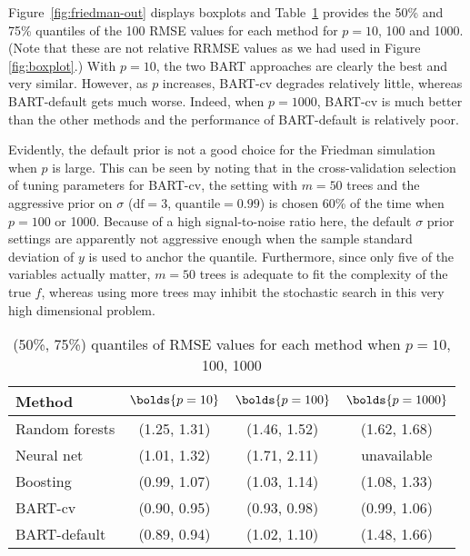 \documentclass[aoas,nameyear,dvips]{arximspdf}
\begin{document}
Figure~\ref{fig:friedman-out} displays boxplots and
Table~\ref{tab:friedman-perf} provides the 50\% and 75\% quantiles of
the 100 RMSE values for each method for $p = 10$, 100 and 1000.  (Note
that these are not relative RRMSE values as we had used in Figure
\ref{fig:boxplot}.)  With $p = 10$, the two BART approaches are clearly
the best and very similar.  However, as $p$ increases, BART-cv degrades
relatively little, whereas BART-default gets much worse. Indeed, when
$p = 1000$, BART-cv is much better than the other methods and the
performance of BART-default is relatively poor.

Evidently, the default prior is not a good choice for the Friedman simulation when $p$ is large.
This can be seen by noting that
in the cross-validation selection of tuning parameters for BART-cv,
the setting with $m = 50$ trees and the aggressive prior on $\sigma$ ($\mathrm{df}=3$, $\mathrm{quantile}=0.99$) is
chosen 60\% of the time when $p = 100$ or 1000.  Because of a high signal-to-noise ratio here,
the default $\sigma$ prior settings are apparently not aggressive enough
when the sample standard deviation of $y$ is used to anchor the quantile.  Furthermore,
since only five of the variables actually matter, $m = 50$ trees is adequate to fit
the complexity of the true $f$, whereas using more trees may inhibit the stochastic
search in this very high dimensional problem.


\iffalse
From a Bayesian perspective, the ``big $p$, small $n$'' scenario cries out for
the use of prior information.
In Bayesian variable selection for linear models, this would be expressed
directly expressed as a prior on the number of variables.
In BART, this prior information is quite naturally needed on $\sigma$ directly
and on the number of variable through the choice of $m$.
\fi


\begin{table}[b]
\tablewidth=290pt
\caption{(50\%, 75\%) quantiles of RMSE values for each method when $p = 10$, 100, 1000}\label{tab:friedman-perf}
\begin{tabular*}{290pt}{@{\extracolsep{\fill}}lccc@{}}
\hline
\textbf{Method}         &   $\bolds{p = 10}$        & $\bolds{p = 100}$        & $\bolds{p = 1000}$       \\
\hline
Random forests &  (1.25, 1.31) & (1.46, 1.52) & (1.62, 1.68)  \\
Neural net     &  (1.01, 1.32) & (1.71, 2.11) &   unavailable  \\
Boosting       &  (0.99, 1.07) & (1.03, 1.14) & (1.08, 1.33)  \\
BART-cv        &  (0.90, 0.95) & (0.93, 0.98) & (0.99, 1.06)  \\
BART-default   &  (0.89, 0.94) & (1.02, 1.10) & (1.48, 1.66)\\
\hline
\end{tabular*}
\end{table}
\end{document}
